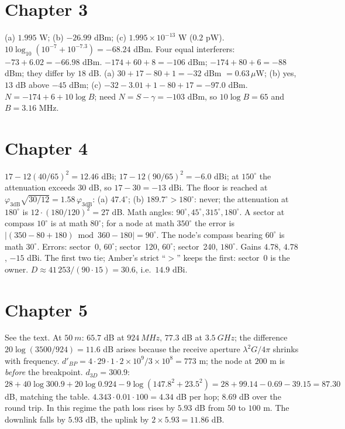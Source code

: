 \section*{Chapter 3}
 (a) $1.995$ W; (b) $-26.99$ dBm; (c) $1.995\times10^{-13}$ W ($0.2$ pW).
 $10\log_{10}(10^{-7}+10^{-7.3})=-68.24$ dBm. Four equal interferers: $-73+6.02=-66.98$ dBm.
 $-174+60+8=-106$ dBm; $-174+80+6=-88$ dBm; they differ by $18$ dB.
 (a) $30+17-80+1=-32$ dBm $=0.63\,\mu$W; (b) yes, $13$ dB above $-45$ dBm; (c) $-32-3.01+1-80+17=-97.0$ dBm.
 $N=-174+6+10\log B$; need $N=S-\gamma=-103$ dBm, so $10\log B=65$ and $B=3.16$ MHz.

\section*{Chapter 4}
 $17-12(40/65)^2=12.46$ dBi; $17-12(90/65)^2=-6.0$ dBi; at $150^\circ$ the attenuation exceeds $30$ dB, so $17-30=-13$ dBi.
 The floor is reached at $\varphi_{3\mathrm{dB}}\sqrt{30/12}=1.58\,\varphi_{3\mathrm{dB}}$: (a) $47.4^\circ$; (b) $189.7^\circ>180^\circ$: never; the attenuation at $180^\circ$ is $12\cdot(180/120)^2=27$ dB.
 Math angles: $90^\circ,45^\circ,315^\circ,180^\circ$. A sector at compass $10^\circ$ is at math $80^\circ$; for a node at math $350^\circ$ the error is $|(350-80+180)\bmod360-180|=90^\circ$.
 The node's compass bearing $60^\circ$ is math $30^\circ$. Errors: sector~0, $60^\circ$; sector~120, $60^\circ$; sector~240, $180^\circ$. Gains $4.78$, $4.78$, $-15$ dBi. The first two tie; Amber's strict ``$>$'' keeps the first: sector~0 is the owner.
 $D\approx41\,253/(90\cdot15)=30.6$, i.e.\ $14.9$ dBi.

\section*{Chapter 5}
 See the text. At $\SI{50}{m}$: $65.7$ dB at $\SI{924}{MHz}$, $77.3$ dB at $\SI{3.5}{GHz}$; the difference $20\log(3500/924)=11.6$ dB arises because the receive aperture $\lambda^2G/4\pi$ shrinks with frequency.
 $d'_{BP}=4\cdot29\cdot1\cdot2\times10^9/3\times10^8=773$ m; the node at $200$ m is \emph{before} the breakpoint.
 $d_{3D}=300.9$: $28+40\log300.9+20\log0.924-9\log(147.8^2+23.5^2)=28+99.14-0.69-39.15=87.30$ dB, matching the table.
 $4.343\cdot0.01\cdot100=4.34$ dB per hop; $8.69$ dB over the round trip.
 In this regime the path loss rises by $5.93$ dB from $50$ to $100$ m. The downlink falls by $5.93$ dB, the uplink by $2\times5.93=11.86$ dB.

